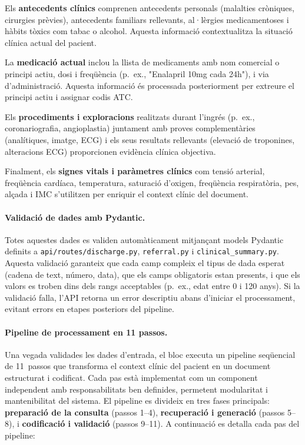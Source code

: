 \documentclass[CAT]{TFUOC}%
\begin{document}
Els \textbf{antecedents clínics} comprenen antecedents personals (malalties cròniques, cirurgies prèvies), antecedents familiars rellevants, al·lèrgies medicamentoses i hàbits tòxics com tabac o alcohol. Aquesta informació contextualitza la situació clínica actual del pacient.

La \textbf{medicació actual} inclou la llista de medicaments amb nom comercial o principi actiu, dosi i freqüència (p.~ex., "Enalapril 10mg cada 24h"), i via d'administració. Aquesta informació és processada posteriorment per extreure el principi actiu i assignar codis ATC.

Els \textbf{procediments i exploracions} realitzats durant l'ingrés (p.~ex., coronariografia, angioplastia) juntament amb proves complementàries (analítiques, imatge, ECG) i els seus resultats rellevants (elevació de troponines, alteracions ECG) proporcionen evidència clínica objectiva.

Finalment, els \textbf{signes vitals i paràmetres clínics} com tensió arterial, freqüència cardíaca, temperatura, saturació d'oxigen, freqüència respiratòria, pes, alçada i IMC s'utilitzen per enriquir el context clínic del document.

\vspace{0.5em}

\paragraph{Validació de dades amb Pydantic.}

Totes aquestes dades es validen automàticament mitjançant models Pydantic definits a \texttt{api/routes/discharge.py}, \texttt{referral.py} i \texttt{clinical\_summary.py}. Aquesta validació garanteix que cada camp compleix el tipus de dada esperat (cadena de text, número, data), que els camps obligatoris estan presents, i que els valors es troben dins dels rangs acceptables (p.~ex., edat entre 0 i 120 anys). Si la validació falla, l'API retorna un error descriptiu abans d'iniciar el processament, evitant errors en etapes posteriors del pipeline.

\vspace{0.5em}

\paragraph{Pipeline de processament en 11 passos.}

Una vegada validades les dades d'entrada, el bloc executa un pipeline seqüencial de 11~passos que transforma el context clínic del pacient en un document estructurat i codificat. Cada pas està implementat com un component independent amb responsabilitats ben definides, permetent modularitat i mantenibilitat del sistema. El pipeline es divideix en tres fases principals: \textbf{preparació de la consulta} (passos 1--4), \textbf{recuperació i generació} (passos 5--8), i \textbf{codificació i validació} (passos 9--11). A continuació es detalla cada pas del pipeline:
\end{document}
